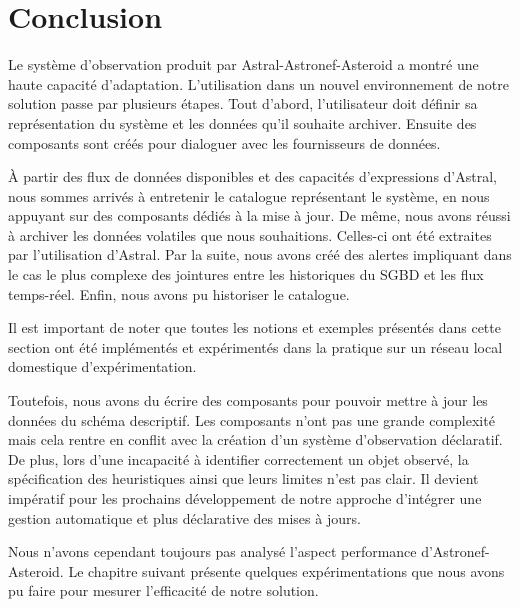 \section{Conclusion}\label{sec:valid:domvision:conclusion}
Le système d'observation produit par Astral-Astronef-Asteroid a montré une haute capacité d'adaptation. L'utilisation dans un nouvel environnement de notre solution passe par plusieurs étapes. Tout d'abord, l'utilisateur doit définir sa représentation du système et les données qu'il souhaite archiver. Ensuite des composants sont créés pour dialoguer avec les fournisseurs de données. 

À partir des flux de données disponibles et des capacités d'expressions d'Astral, nous sommes arrivés à entretenir le catalogue représentant le système, en nous appuyant sur des composants dédiés à la mise à jour. De même, nous avons réussi à archiver les données volatiles que nous souhaitions. Celles-ci ont été extraites par l'utilisation d'Astral. Par la suite, nous avons créé des alertes impliquant dans le cas le plus complexe des jointures entre les historiques du SGBD et les flux temps-réel. Enfin, nous avons pu historiser le catalogue.

Il est important de noter que toutes les notions et exemples présentés dans cette section ont été implémentés et expérimentés dans la pratique sur un réseau local domestique d'expérimentation.

Toutefois, nous avons du écrire des composants pour pouvoir mettre à jour les données du schéma descriptif. Les composants n'ont pas une grande complexité mais cela rentre en conflit avec la création d'un système d'observation déclaratif. De plus, lors d'une incapacité à identifier correctement un objet observé, la spécification des heuristiques ainsi que leurs limites n'est pas clair. Il devient impératif pour les prochains développement de notre approche d'intégrer une gestion automatique et plus déclarative des mises à jours.

Nous n'avons cependant toujours pas analysé l'aspect performance d'Astronef-Asteroid. Le chapitre suivant présente quelques expérimentations que nous avons pu faire pour mesurer l'efficacité de notre solution.